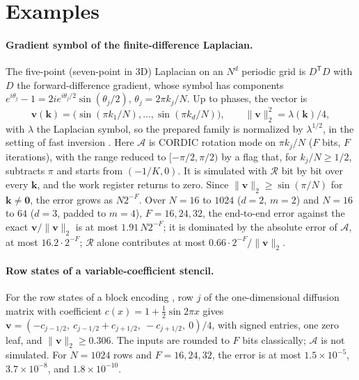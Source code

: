 \documentclass[9pt,twocolumn]{extarticle}
\newcommand{\norm}[1]{\lVert #1\rVert}
\begin{document}
\section{Examples}\label{sec:examples}

\paragraph{Gradient symbol of the finite-difference Laplacian.} The five-point
(seven-point in 3D) Laplacian on an $N^d$ periodic grid is $D^{\mathsf T}D$ with
$D$ the forward-difference gradient, whose symbol has components
$e^{i\theta_j} - 1 = 2ie^{i\theta_j/2}\sin(\theta_j/2)$,
$\theta_j = 2\pi k_j/N$. Up to phases, the vector is
\begin{equation}
\bm v(\bm k) = \bigl(\sin(\pi k_1/N), \dots, \sin(\pi k_d/N)\bigr),
\qquad \norm{\bm v}_2^2 = \lambda(\bm k)/4 ,
\end{equation}
with $\lambda$ the Laplacian symbol, so the prepared family is normalized by
$\lambda^{1/2}$, in the setting of fast inversion \cite{tong2021fast}. Here
$\mathcal A$ is CORDIC rotation mode on $\pi k_j/N$ ($F$ bits, $F$
iterations), with the range reduced to $[-\pi/2, \pi/2)$ by a flag that, for
$k_j/N \ge 1/2$, subtracts $\pi$ and starts from $(-1/K, 0)$. It is simulated with $\mathcal R$ bit by
bit over every $\bm k$, and the work register returns to zero. Since
$\norm{\bm v}_2 \ge \sin(\pi/N)$ for $\bm k \ne \bm 0$, the error grows as
$N2^{-F}$. Over $N = 16$ to $1024$ ($d = 2$, $m = 2$) and $N = 16$ to $64$
($d = 3$, padded to $m = 4$), $F = 16, 24, 32$, the end-to-end error against
the exact $\bm v/\norm{\bm v}_2$ is at most $1.91\,N2^{-F}$; it is dominated by
the absolute error of $\mathcal A$, at most $16.2\cdot2^{-F}$; $\mathcal R$ alone
contributes at most $0.66\cdot2^{-F}/\norm{\bm v}_2$.

\paragraph{Row states of a variable-coefficient stencil.} For the row states
of a block encoding \cite{gilyen2019quantum,kerenidis2017recommendation}, row
$j$ of the one-dimensional diffusion matrix with coefficient
$c(x) = 1 + \tfrac12\sin 2\pi x$ gives
$\bm v = (-c_{j-1/2},\ c_{j-1/2} + c_{j+1/2},\ -c_{j+1/2},\ 0)/4$,
with signed entries, one zero leaf, and $\norm{\bm v}_2 \ge 0.306$. The inputs are
rounded to $F$ bits classically; $\mathcal A$ is not simulated.
For $N = 1024$ rows and $F = 16, 24, 32$, the error is at most
$1.5\times10^{-5}$, $3.7\times10^{-8}$, and $1.8\times10^{-10}$.
\end{document}
